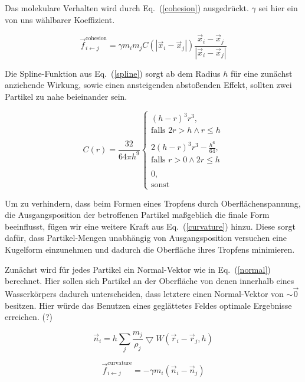 \documentclass[a4paper]{paper}
\renewcommand{\eqref}[1]{Eq.~(\ref{#1})}
\begin{document}
Das molekulare Verhalten wird durch \eqref{cohesion} ausgedrückt. $\gamma$ sei hier ein von uns wählbarer Koeffizient.

\begin{equation}
\label{cohesion}
\vec{f}_{i\leftarrow j}^{\text{cohesion}} = \gamma m_{i} m_{j} C(|\vec{x}_i - \vec{x}_j|)\frac{\vec{x}_i - \vec{x}_j}{|\vec{x}_i - \vec{x}_j|}
\end{equation}

Die Spline-Funktion aus \eqref{spline} sorgt ab dem Radius $h$ für eine zunächst anziehende Wirkung, sowie einen ansteigenden abstoßenden Effekt, sollten zwei Partikel zu nahe beieinander sein.

\begin{equation}
\label{spline}
C(r) = \frac{32}{64 \pi h^9}
\begin{cases}
(h-r)^3r^3,   \\ \text{falls }  2r > h \land r \leq h\\

\\ 
2(h-r)^3r^3 - \frac{h^6}{64}, \\ \text{falls } r > 0 \land 2r \leq h\\
\\
0, \\ \text{sonst}  
\end{cases}
\end{equation}




Um zu verhindern, dass beim Formen eines Tropfens durch Oberflächenspannung, die Ausgangsposition der betroffenen Partikel maßgeblich die finale Form beeinflusst, fügen wir eine weitere Kraft aus \eqref{curvature} hinzu.
Diese sorgt dafür, dass Partikel-Mengen unabhängig von Ausgangsposition versuchen eine Kugelform einzunehmen und dadurch die Oberfläche ihres Tropfens minimieren.

Zunächst wird für jedes Partikel ein Normal-Vektor wie in \eqref{normal} berechnet. Hier sollen sich Partikel an der Oberfläche von denen innerhalb eines Wasserkörpers dadurch unterscheiden, dass letztere einen Normal-Vektor von $\sim \vec{0}$ besitzen. Hier würde das Benutzen eines geglättetes Feldes optimale Ergebnisse erreichen. (?)

\begin{equation}
\label{normal}
\vec{n}_{i} = h\sum_{j}\frac{m_{j}}{\rho_{j}}\bigtriangledown W (\vec{r}_{i}-\vec{r}_{j},h)
\end{equation}

\begin{equation}
\label{curvature}
\vec{f}_{i\leftarrow j}^{\text{curvature}} = -\gamma m_{i}(\vec{n}_i - \vec{n}_j)
\end{equation}
\end{document}
